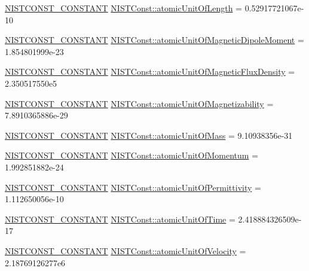 \begin{DoxyCompactItemize}
\item 
\mbox{\hyperlink{_n_i_s_t_const_8hpp_a2b0fc1d7452373f816175dd86ce26729}{N\+I\+S\+T\+C\+O\+N\+S\+T\+\_\+\+C\+O\+N\+S\+T\+A\+NT}} \mbox{\hyperlink{group___n_i_s_t_const-_atomic_unit_ga2611c2902279953d3d6a18cfd1dfce3e}{N\+I\+S\+T\+Const\+::atomic\+Unit\+Of\+Length}} = 0.\+52917721067e-\/10
\item 
\mbox{\hyperlink{_n_i_s_t_const_8hpp_a2b0fc1d7452373f816175dd86ce26729}{N\+I\+S\+T\+C\+O\+N\+S\+T\+\_\+\+C\+O\+N\+S\+T\+A\+NT}} \mbox{\hyperlink{group___n_i_s_t_const-_atomic_unit_gacc6b0608f4456d2fb880dc295b852433}{N\+I\+S\+T\+Const\+::atomic\+Unit\+Of\+Magnetic\+Dipole\+Moment}} = 1.\+854801999e-\/23
\item 
\mbox{\hyperlink{_n_i_s_t_const_8hpp_a2b0fc1d7452373f816175dd86ce26729}{N\+I\+S\+T\+C\+O\+N\+S\+T\+\_\+\+C\+O\+N\+S\+T\+A\+NT}} \mbox{\hyperlink{group___n_i_s_t_const-_atomic_unit_gafc19eaca8ac811b061e8630bd3203930}{N\+I\+S\+T\+Const\+::atomic\+Unit\+Of\+Magnetic\+Flux\+Density}} = 2.\+350517550e5
\item 
\mbox{\hyperlink{_n_i_s_t_const_8hpp_a2b0fc1d7452373f816175dd86ce26729}{N\+I\+S\+T\+C\+O\+N\+S\+T\+\_\+\+C\+O\+N\+S\+T\+A\+NT}} \mbox{\hyperlink{group___n_i_s_t_const-_atomic_unit_ga20e7e2a56b476e5730ce9c59a4efc946}{N\+I\+S\+T\+Const\+::atomic\+Unit\+Of\+Magnetizability}} = 7.\+8910365886e-\/29
\item 
\mbox{\hyperlink{_n_i_s_t_const_8hpp_a2b0fc1d7452373f816175dd86ce26729}{N\+I\+S\+T\+C\+O\+N\+S\+T\+\_\+\+C\+O\+N\+S\+T\+A\+NT}} \mbox{\hyperlink{group___n_i_s_t_const-_atomic_unit_gaffbb7b29a9d92b540321f074f46903ae}{N\+I\+S\+T\+Const\+::atomic\+Unit\+Of\+Mass}} = 9.\+10938356e-\/31
\item 
\mbox{\hyperlink{_n_i_s_t_const_8hpp_a2b0fc1d7452373f816175dd86ce26729}{N\+I\+S\+T\+C\+O\+N\+S\+T\+\_\+\+C\+O\+N\+S\+T\+A\+NT}} \mbox{\hyperlink{group___n_i_s_t_const-_atomic_unit_ga3a2d8ad829da0868381d6f31817ed453}{N\+I\+S\+T\+Const\+::atomic\+Unit\+Of\+Momentum}} = 1.\+992851882e-\/24
\item 
\mbox{\hyperlink{_n_i_s_t_const_8hpp_a2b0fc1d7452373f816175dd86ce26729}{N\+I\+S\+T\+C\+O\+N\+S\+T\+\_\+\+C\+O\+N\+S\+T\+A\+NT}} \mbox{\hyperlink{group___n_i_s_t_const-_atomic_unit_ga150ae2f35ef916113c6bcf612b7fa8c8}{N\+I\+S\+T\+Const\+::atomic\+Unit\+Of\+Permittivity}} = 1.\+112650056e-\/10
\item 
\mbox{\hyperlink{_n_i_s_t_const_8hpp_a2b0fc1d7452373f816175dd86ce26729}{N\+I\+S\+T\+C\+O\+N\+S\+T\+\_\+\+C\+O\+N\+S\+T\+A\+NT}} \mbox{\hyperlink{group___n_i_s_t_const-_atomic_unit_ga1dd9cd3a8f95c754529e663dc03d7b9e}{N\+I\+S\+T\+Const\+::atomic\+Unit\+Of\+Time}} = 2.\+418884326509e-\/17
\item 
\mbox{\hyperlink{_n_i_s_t_const_8hpp_a2b0fc1d7452373f816175dd86ce26729}{N\+I\+S\+T\+C\+O\+N\+S\+T\+\_\+\+C\+O\+N\+S\+T\+A\+NT}} \mbox{\hyperlink{group___n_i_s_t_const-_atomic_unit_gaf53a1d1a7382eb03e12e980aeb34ded4}{N\+I\+S\+T\+Const\+::atomic\+Unit\+Of\+Velocity}} = 2.\+18769126277e6
\end{DoxyCompactItemize}


